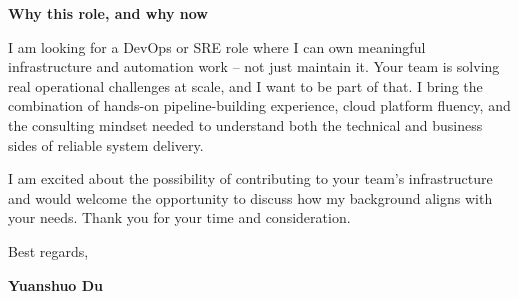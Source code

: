 \documentclass{coverletter}
\begin{document}
\vspace{0.30cm}

\noindent%
{\color{secondary}\sffamily\small\bfseries
  Why this role, and why now
}

\vspace{0.12cm}

\noindent%
{\color{secondary}\sffamily\small
  I am looking for a DevOps or SRE role where I can own meaningful infrastructure and automation work -- not just maintain it. Your team is solving real operational challenges at scale, and I want to be part of that. I bring the combination of hands-on pipeline-building experience, cloud platform fluency, and the consulting mindset needed to understand both the technical and business sides of reliable system delivery.
}

\vspace{0.35cm}

\noindent%
{\color{secondary}\sffamily\small
  I am excited about the possibility of contributing to your team's infrastructure and would welcome the opportunity to discuss how my background aligns with your needs. Thank you for your time and consideration.
}

\vspace{0.30cm}

\noindent%
{\color{secondary}\sffamily\small
  Best regards,
}

\vspace{0.10cm}

\noindent%
{\sffamily\small\color{namecolor}\bfseries
  Yuanshuo Du
}
\end{document}
